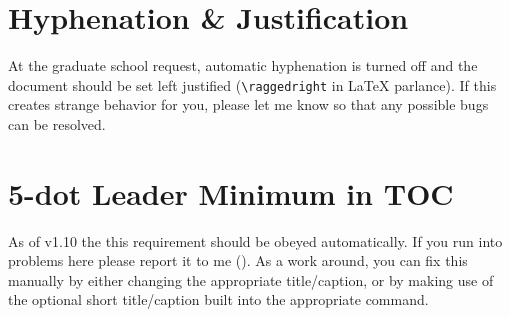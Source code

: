 \section{Hyphenation \& Justification}
At the graduate school request, automatic hyphenation is turned off and the document should be set left justified (\verb=\raggedright= in LaTeX parlance).  If this creates strange behavior for you, please let me know so that any possible bugs can be resolved.

\section{5-dot Leader Minimum in TOC}
As of v1.10 the this requirement should be obeyed automatically.  If you run into problems here please report it to me (\email).  As a work around, you can fix this manually by either changing the appropriate title/caption, or by making use of the optional short title/caption built into the appropriate command.

\endinput
